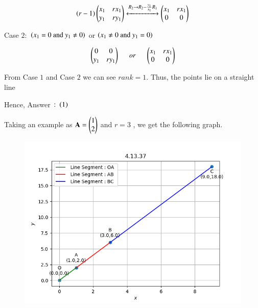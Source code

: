 \documentclass[journal]{IEEEtran}
\numberwithin{equation}{enumi}
\numberwithin{figure}{enumi}
\begin{document}
\begin{align}
    \left(r-1\right)\begin{pmatrix}x_1 & rx_1 \\ y_1 & ry_1\end{pmatrix} \xleftrightarrow[]{R_2 \rightarrow {R_2 - \frac{y_1}{x_1}R_1 }} \begin{pmatrix}x_1 & rx_1 \\ 0 & 0 \end{pmatrix}
\end{align}

Case $2\colon$ $\left(x_1 = 0  \text{ and }  y_1 \neq 0\right)$ or $\left(x_1 \neq 0 \text{ and }  y_1 = 0 \right)$

\begin{align}
    \begin{pmatrix}0 & 0 \\ y_1 & ry_1\end{pmatrix} \hspace{0.5cm}or\hspace{0.5cm} \begin{pmatrix}x_1 & rx_1 \\ 0 & 0\end{pmatrix} 
\end{align}

From Case $1$ and Case $2$ we can see $rank = 1$. Thus, the points lie on a straight line

Hence, Answer $\colon \left(1\right)$


Taking an example as $\mathbf{A} = \begin{pmatrix}1 \\ 2\end{pmatrix}$ and $r=3$ , we get the following graph.

\begin{figure}[H]
    \centering
    \includegraphics[width=1.0\columnwidth]{figs/colli1.png}
    \caption*{}
    \label{fig:}
\end{figure}
\end{document}

